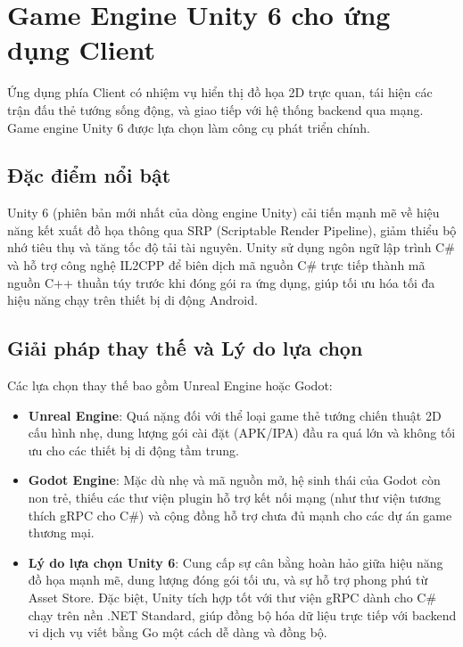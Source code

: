 \documentclass[../Project.tex]{subfiles}
\begin{document}
\section{Game Engine Unity 6 cho ứng dụng Client}
\label{sec:tech_unity}
Ứng dụng phía Client có nhiệm vụ hiển thị đồ họa 2D trực quan, tái hiện các trận đấu thẻ tướng sống động, và giao tiếp với hệ thống backend qua mạng. Game engine Unity 6 \cite{unity2026} được lựa chọn làm công cụ phát triển chính.

\subsection{Đặc điểm nổi bật}
Unity 6 (phiên bản mới nhất của dòng engine Unity) cải tiến mạnh mẽ về hiệu năng kết xuất đồ họa thông qua SRP (Scriptable Render Pipeline), giảm thiểu bộ nhớ tiêu thụ và tăng tốc độ tải tài nguyên. Unity sử dụng ngôn ngữ lập trình C\# và hỗ trợ công nghệ IL2CPP để biên dịch mã nguồn C\# trực tiếp thành mã nguồn C++ thuần túy trước khi đóng gói ra ứng dụng, giúp tối ưu hóa tối đa hiệu năng chạy trên thiết bị di động Android.

\subsection{Giải pháp thay thế và Lý do lựa chọn}
Các lựa chọn thay thế bao gồm Unreal Engine hoặc Godot:
\begin{itemize}
    \item \textbf{Unreal Engine}: Quá nặng đối với thể loại game thẻ tướng chiến thuật 2D cấu hình nhẹ, dung lượng gói cài đặt (APK/IPA) đầu ra quá lớn và không tối ưu cho các thiết bị di động tầm trung.
    \item \textbf{Godot Engine}: Mặc dù nhẹ và mã nguồn mở, hệ sinh thái của Godot còn non trẻ, thiếu các thư viện plugin hỗ trợ kết nối mạng (như thư viện tương thích gRPC cho C\#) và cộng đồng hỗ trợ chưa đủ mạnh cho các dự án game thương mại.
    \item \textbf{Lý do lựa chọn Unity 6}: Cung cấp sự cân bằng hoàn hảo giữa hiệu năng đồ họa mạnh mẽ, dung lượng đóng gói tối ưu, và sự hỗ trợ phong phú từ Asset Store. Đặc biệt, Unity tích hợp tốt với thư viện gRPC dành cho C\# chạy trên nền .NET Standard, giúp đồng bộ hóa dữ liệu trực tiếp với backend vi dịch vụ viết bằng Go một cách dễ dàng và đồng bộ.
\end{itemize}
\end{document}
